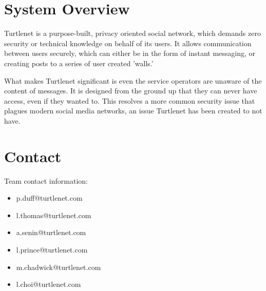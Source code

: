 \section{System Overview}
Turtlenet is a purpose-built, privacy oriented social network, which demands
zero security or technical knowledge on behalf of its users. It allows
communication between users securely, which can either be in the form of 
instant messaging, or creating posts to a series of user created 'walls.'

What makes Turtlenet significant is even the service operators are unaware of
the content of messages. It is designed from the ground up that they can never
have access, even if they wanted to. This resolves a more common security
issue that plagues modern social media networks, an issue Turtlenet has been
created to not have.

\section{Contact}
Team contact information:
\begin{itemize}
\item p.duff@turtlenet.com
\item l.thomas@turtlenet.com
\item a.senin@turtlenet.com
\item l.prince@turtlenet.com
\item m.chadwick@turtlenet.com
\item l.choi@turtlenet.com
\end{itemize}
